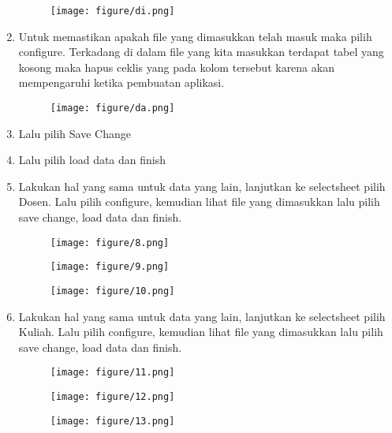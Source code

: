 \documentclass{article}
\begin{document}
\begin{enumerate}
\begin{figure}[h]
\centerline{\texttt{[image: figure/di.png]}}
\end{figure}
\newpage \item Untuk memastikan apakah file yang dimasukkan telah masuk maka pilih configure. Terkadang di dalam file yang kita masukkan terdapat tabel yang kosong maka hapus ceklis yang pada kolom tersebut karena akan mempengaruhi ketika pembuatan aplikasi.
\begin{figure}
\centerline{\texttt{[image: figure/da.png]}}
\end{figure}
\item Lalu pilih Save Change
\item Lalu pilih load data dan finish
 \item Lakukan hal yang sama untuk data yang lain, lanjutkan ke selectsheet pilih Dosen. Lalu pilih configure, kemudian lihat file yang dimasukkan lalu pilih save change, load data dan finish.
\newpage \begin{figure}
\centerline{\texttt{[image: figure/8.png]}}
\end{figure}
\begin{figure}
\centerline{\texttt{[image: figure/9.png]}}
\end{figure}
\begin{figure}
\centerline{\texttt{[image: figure/10.png]}}
\end{figure}
\newpage \item Lakukan hal yang sama untuk data yang lain, lanjutkan ke selectsheet pilih Kuliah. Lalu pilih configure, kemudian lihat file yang dimasukkan lalu pilih save change, load data dan finish.
\begin{figure}
\centerline{\texttt{[image: figure/11.png]}}
\end{figure}
\begin{figure}
\centerline{\texttt{[image: figure/12.png]}}
\end{figure}
\begin{figure}
\centerline{\texttt{[image: figure/13.png]}}
\end{figure}
    

\end{enumerate}
\end{document}
